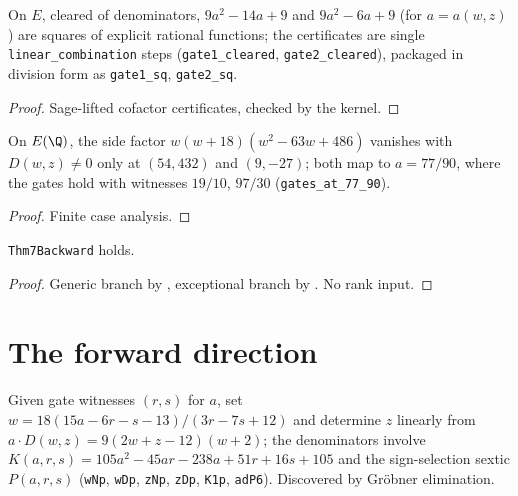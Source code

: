 \begin{lemma}\label{lem:gatescleared}
\leanok
{}
On $E$, cleared of denominators, $9a^2-14a+9$ and $9a^2-6a+9$
(for $a = a(w,z)$) are squares of explicit rational functions;
the certificates are single \texttt{linear\_combination} steps
(\texttt{gate1\_cleared}, \texttt{gate2\_cleared}), packaged in division
form as \texttt{gate1\_sq}, \texttt{gate2\_sq}.
\end{lemma}
\begin{proof}\leanok
Sage-lifted cofactor certificates, checked by the kernel.
\end{proof}

\begin{lemma}\label{lem:exceptional}
\leanok
{}
On $E(\Q)$, the side factor $w(w+18)(w^2-63w+486)$ vanishes with
$D(w,z) \neq 0$ only at $(54,432)$ and $(9,-27)$; both map to
$a = 77/90$, where the gates hold with witnesses $19/10$, $97/30$
(\texttt{gates\_at\_77\_90}).
\end{lemma}
\begin{proof}\leanok
Finite case analysis.
\end{proof}

\begin{theorem}\label{thm:backward}
\leanok
{}
\texttt{Thm7Backward} holds.
\end{theorem}
\begin{proof}\leanok
Generic branch by , exceptional branch by
.  No rank input.
\end{proof}

\section{The forward direction}

\begin{definition}\label{def:inverse}
\leanok
{}
Given gate witnesses $(r,s)$ for $a$, set
$w = 18(15a-6r-s-13)/(3r-7s+12)$ and determine $z$ linearly from
$a \cdot D(w,z) = 9(2w+z-12)(w+2)$; the denominators involve
$K(a,r,s) = 105a^2-45ar-238a+51r+16s+105$ and the sign-selection sextic
$P(a,r,s)$ (\texttt{wNp}, \texttt{wDp}, \texttt{zNp}, \texttt{zDp},
\texttt{K1p}, \texttt{adP6}).  Discovered by Gr\"obner elimination.
\end{definition}

